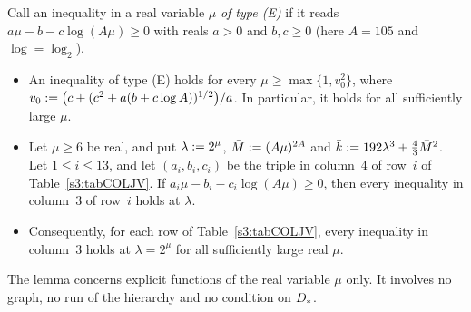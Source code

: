 \begin{lemma}\label{s3:lemCOLJVev}
Call an inequality in a real variable $\mu$ \emph{of type (E)} if it reads
$a\mu-b-c\log(A\mu)\ge0$ with reals $a>0$ and $b,c\ge0$ (here $A=105$ and
$\log=\log_2$).
\begin{itemize}
\item[(i)] An inequality of type (E) holds for every
  $\mu\ge\max\{1,v_0^2\}$, where
  $v_0\mathrel{:=}\bigl(c+(c^2+a(b+c\log A))^{1/2}\bigr)/a$. In particular, it holds
  for all sufficiently large $\mu$.
\item[(ii)] Let $\mu\ge6$ be real, and put $\lambda\mathrel{:=}2^\mu$,
  $\bar M\mathrel{:=}(A\mu)^{2A}$ and $\bar k\mathrel{:=}192\lambda^3+\frac43\bar M^2$. Let
  $1\le i\le13$, and let $(a_i,b_i,c_i)$ be the triple in column~4 of row~$i$
  of Table~\ref{s3:tabCOLJV}. If $a_i\mu-b_i-c_i\log(A\mu)\ge0$, then every
  inequality in column~3 of row~$i$ holds at $\lambda$.
\item[(iii)] Consequently, for each row of Table~\ref{s3:tabCOLJV}, every
  inequality in column~3 holds at $\lambda=2^\mu$ for all sufficiently large
  real $\mu$.
\end{itemize}
The lemma concerns explicit functions of the real variable $\mu$ only. It
involves no graph, no run of the hierarchy and no condition on $D_{*}$.
\end{lemma}

